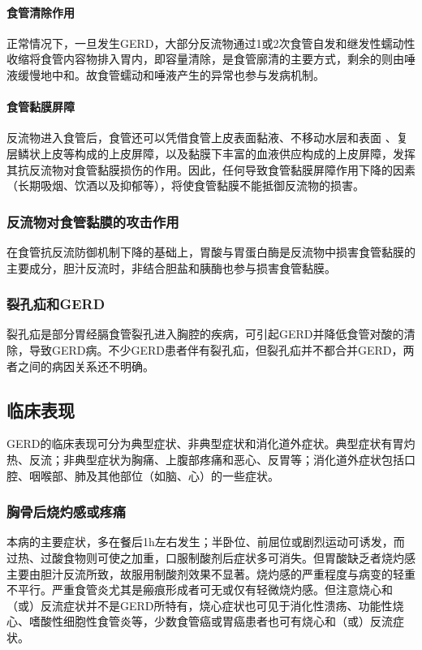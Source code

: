 \paragraph{食管清除作用}

正常情况下，一旦发生GERD，大部分反流物通过1或2次食管自发和继发性蠕动性收缩将食管内容物排入胃内，即容量清除，是食管廓清的主要方式，剩余的则由唾液缓慢地中和。故食管蠕动和唾液产生的异常也参与发病机制。
\paragraph{食管黏膜屏障}

反流物进入食管后，食管还可以凭借食管上皮表面黏液、不移动水层和表面
、复层鳞状上皮等构成的上皮屏障，以及黏膜下丰富的血液供应构成的上皮屏障，发挥其抗反流物对食管黏膜损伤的作用。因此，任何导致食管黏膜屏障作用下降的因素（长期吸烟、饮酒以及抑郁等），将使食管黏膜不能抵御反流物的损害。

\subsubsection{反流物对食管黏膜的攻击作用}

在食管抗反流防御机制下降的基础上，胃酸与胃蛋白酶是反流物中损害食管黏膜的主要成分，胆汁反流时，非结合胆盐和胰酶也参与损害食管黏膜。

\subsubsection{裂孔疝和GERD}

裂孔疝是部分胃经膈食管裂孔进入胸腔的疾病，可引起GERD并降低食管对酸的清除，导致GERD病。不少GERD患者伴有裂孔疝，但裂孔疝并不都合并GERD，两者之间的病因关系还不明确。

\subsection{临床表现}

GERD的临床表现可分为典型症状、非典型症状和消化道外症状。典型症状有胃灼热、反流；非典型症状为胸痛、上腹部疼痛和恶心、反胃等；消化道外症状包括口腔、咽喉部、肺及其他部位（如脑、心）的一些症状。

\subsubsection{胸骨后烧灼感或疼痛}

本病的主要症状，多在餐后1h左右发生；半卧位、前屈位或剧烈运动可诱发，而过热、过酸食物则可使之加重，口服制酸剂后症状多可消失。但胃酸缺乏者烧灼感主要由胆汁反流所致，故服用制酸剂效果不显著。烧灼感的严重程度与病变的轻重不平行。严重食管炎尤其是瘢痕形成者可无或仅有轻微烧灼感。但注意烧心和（或）反流症状并不是GERD所特有，烧心症状也可见于消化性溃疡、功能性烧心、嗜酸性细胞性食管炎等，少数食管癌或胃癌患者也可有烧心和（或）反流症状。

